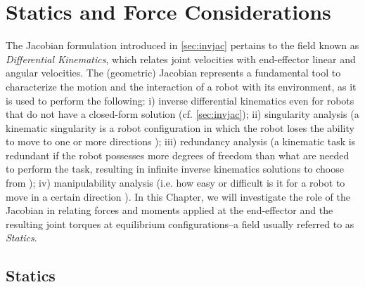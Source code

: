 \chapter{Statics and Force Considerations}
\label{ch:forces}


The Jacobian formulation introduced in \cref{sec:invjac} pertains to the field known as \emph{Differential Kinematics}, which relates joint velocities with end-effector linear and angular velocities. The (geometric) Jacobian represents a fundamental tool to characterize the motion and the interaction of a robot with its environment, as it is used to perform the following:
  i) inverse differential kinematics even for robots that do not have a closed-form solution (cf. \cref{sec:invjac});
 ii) singularity analysis (a kinematic singularity is a robot configuration in which the robot loses the ability to move to one or more directions \cite{sciavicco2012modelling});
iii) redundancy analysis (a kinematic task is redundant if the robot possesses more degrees of freedom than what are needed to perform the task, resulting in infinite inverse kinematics solutions to choose from \cite{sciavicco2012modelling});
 iv) manipulability analysis (i.e. how easy or difficult is it for a robot to move in a certain direction \cite{sciavicco2012modelling}).
In this Chapter, we will investigate the role of the Jacobian in relating forces and moments applied at the end-effector and the resulting joint torques at equilibrium configurations--a field usually referred to as \emph{Statics}.



\section{Statics}

